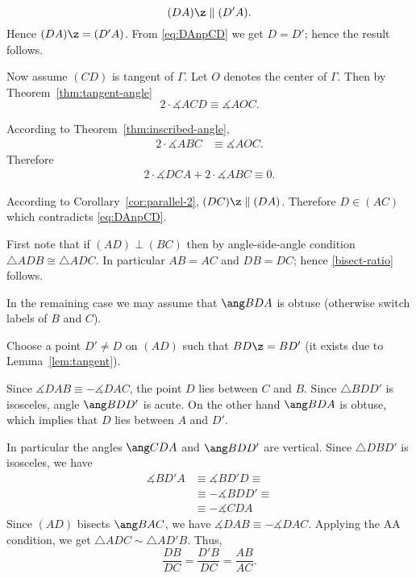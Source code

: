 $$(DA)\z\parallel(D'A).$$
Hence $(DA)\z=(D'A)$. 
From \ref{eq:DAnpCD} we get $D=D'$;
hence the result follows.

 Now assume $(CD)$ is tangent of $\Gamma$.
Let $O$ denotes the center of $\Gamma$.
Then
by Theorem~\ref{thm:tangent-angle}
$$2\cdot\measuredangle ACD\equiv \measuredangle AOC.$$


According to Theorem~\ref{thm:inscribed-angle},
\begin{align*}
2\cdot\measuredangle ABC&\equiv\measuredangle AOC.
\end{align*}
Therefore
\begin{align*}
2\cdot\measuredangle DCA+2\cdot\measuredangle ABC\equiv0.
\end{align*}

According to Corollary~\ref{cor:parallel-2}, $(DC)\z\parallel(DA)$. 
Therefore $D\in (AC)$ which contradicts \ref{eq:DAnpCD}.
















First note that if $(AD)\perp(BC)$ then by angle-side-angle condition $\triangle A D B\cong\triangle ADC$.
In particular $AB=AC$ and $DB=DC$; hence \ref{bisect-ratio} follows.

In the remaining case we may assume that $\ang B D A$ is obtuse (otherwise switch labels of $B$ and $C$).

Choose a point $D'\not=D$ on $(AD)$ such that $B D\z=B D'$ (it exists due to Lemma~\ref{lem:tangent}).

Since $\measuredangle DAB\equiv-\measuredangle DAC$,
the point
$D$ lies between $C$ and $B$.
Since $\triangle BDD'$ is isosceles,
angle $\ang BDD'$ is acute.
On the other hand $\ang B D A$ is obtuse, 
which implies that $D$ lies between $A$ and $D'$.

In particular the angles $\ang C D A$ and $\ang B D D'$ are vertical.
Since $\triangle D B D'$ is isosceles, we have 
\begin{align*}
\measuredangle B D' A&\equiv \measuredangle B D' D\equiv
\\
&\equiv -\measuredangle B D D'\equiv
\\
&\equiv -\measuredangle C D A
\end{align*}
Since $(AD)$ bisects $\ang B A C$, we have $\measuredangle DAB\equiv -\measuredangle D A C$.
Applying the AA condition, we get $\triangle ADC\sim \triangle A D' B$.
Thus,
$$\frac{DB}{DC}=\frac{D' B}{DC}=\frac{AB}{AC}.$$
\qedsf









